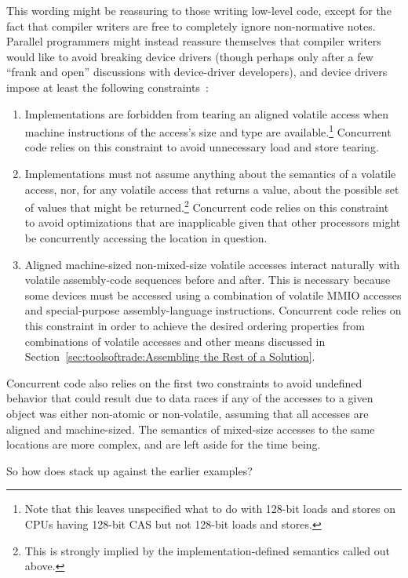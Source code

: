This wording might be reassuring to those writing low-level code, except
for the fact that compiler writers are free to completely ignore
non-normative notes.
Parallel programmers might instead reassure themselves that compiler
writers would like to avoid breaking device drivers (though perhaps
only after a few ``frank and open'' discussions with device-driver
developers), and device drivers impose at least the following
constraints~\cite{PaulEMcKenney2016P0124R6-LKMM}:

\begin{enumerate}
\item	Implementations are forbidden from tearing an aligned volatile
	access when machine instructions of the access's size and type
	are available.\footnote{
		Note that this leaves unspecified what to do with 128-bit
		loads and stores on CPUs having 128-bit CAS but not
		128-bit loads and stores.}
	Concurrent code relies on this constraint to avoid unnecessary
	load and store tearing.
\item	Implementations must not assume anything about the semantics of
	a volatile access, nor, for any volatile access that returns a
	value, about the possible set of values that might be
	returned.\footnote{
		This is strongly implied by the implementation-defined
		semantics called out above.}
	Concurrent code relies on this constraint to avoid optimizations
	that are inapplicable given that other processors might be
	concurrently accessing the location in question.
\item	Aligned machine-sized non-mixed-size volatile accesses interact
	naturally with volatile assembly-code sequences before and after.
	This is necessary because some devices must be accessed using
	a combination of volatile MMIO accesses and special-purpose
	assembly-language instructions.
	Concurrent code relies on this constraint in order to achieve
	the desired ordering properties from combinations of volatile
	accesses and other means discussed in
	Section~\ref{sec:toolsoftrade:Assembling the Rest of a Solution}.
\end{enumerate}

Concurrent code also relies on the first two constraints to avoid
undefined behavior that could result due to data races if any of the
accesses to a given object was either non-atomic or non-volatile,
assuming that all accesses are aligned and machine-sized.
The semantics of mixed-size accesses to the same locations are more
complex, and are left aside for the time being.

So how does  stack up against the earlier examples?

